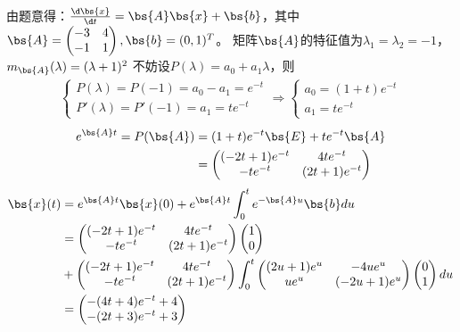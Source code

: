 \documentclass[12pt, a4paper, oneside, UTF8]{ctexbook}
\begin{document}
\begin{solution}
    由题意得：$\frac{\d \bs{x}}{\d t}=\bs{A}\bs{x}+\bs{b}$，其中$\bs{A}=\begin{pmatrix}
        -3&4\\
        -1&1
    \end{pmatrix},\bs{b}=(0,1)^T$。
    矩阵$\bs{A}$的特征值为$\lambda_1=\lambda_2=-1$，$m_{\bs{A}}(\lambda)=(\lambda+1)^2$
    不妨设$P(\lambda)=a_0+a_1\lambda$，则 \begin{align*}
        \left\{
            \begin{array}{ll}
                P(\lambda)=P(-1)=a_0-a_1=e^{-t}\\
                P'(\lambda)=P'(-1)=a_1=te^{-t}
            \end{array}
            \right.
        \Rightarrow
        \left\{
            \begin{array}{ll}
                a_0=(1+t)e^{-t}\\
                a_1=te^{-t}
            \end{array}
            \right.
    \end{align*}
    \begin{align*}
        e^{\bs{A}t}=P(\bs{A})
    &=(1+t)e^{-t}\bs{E}+te^{-t}\bs{A}\\
    &=\begin{pmatrix}
        (-2t+1)e^{-t} &4te^{-t} \\
        -te^{-t}  & (2t+1)e^{-t}
    \end{pmatrix}
    \end{align*}
    \begin{align*}
        \bs{x}(t)&=e^{\bs{A}t}\bs{x}(0)+e^{\bs{A}t}\int_{0}^t e^{-\bs{A}u}\bs{b} du\\
        &=\begin{pmatrix}
            (-2t+1)e^{-t} &4te^{-t} \\
        -te^{-t}  & (2t+1)e^{-t}
        \end{pmatrix}\begin{pmatrix}
            1 \\
            0
        \end{pmatrix}\\
        &+\begin{pmatrix}
            (-2t+1)e^{-t} &4te^{-t} \\
        -te^{-t}  & (2t+1)e^{-t}
        \end{pmatrix}\int_{0}^t 
        \begin{pmatrix}
            (2u+1)e^{u} &-4ue^{u} \\
            ue^{u}  & (-2u+1)e^{u}
        \end{pmatrix} \begin{pmatrix}
            0\\
            1
        \end{pmatrix} du \\
        &=\begin{pmatrix}
            -(4t+4)e^{-t}+4 \\
            -(2t+3)e^{-t}+3
        \end{pmatrix}
        \end{align*}
\end{solution}
\end{document}
